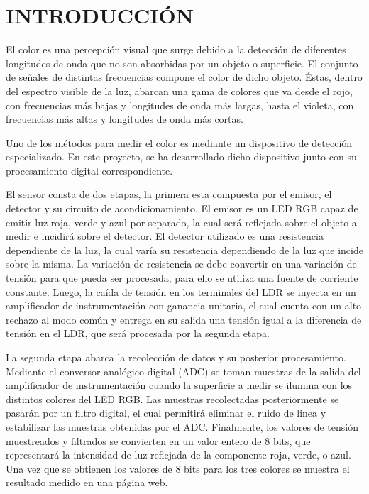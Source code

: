 \documentclass[12pt,a4paper,twoside,fleqn]{article}
\begin{document}
\section*{INTRODUCCIÓN}
El color es una percepción visual que surge debido a la detección de diferentes longitudes de onda que no son absorbidas por un objeto o superficie. El conjunto de señales de distintas frecuencias compone el color de dicho objeto. Éstas, dentro del espectro visible de la luz, abarcan una gama de colores que va desde el rojo, con frecuencias más bajas y longitudes de onda más largas, hasta el violeta, con frecuencias más altas y longitudes de onda más cortas.\cite{ARPN_RGB_COLOR_SENSING}

Uno de los métodos para medir el color es mediante un dispositivo de detección especializado. En este proyecto, se ha desarrollado dicho dispositivo junto con su procesamiento digital correspondiente.

El sensor consta de dos etapas, la primera esta compuesta por el emisor, el detector y su circuito de acondicionamiento. El emisor es un LED RGB capaz de emitir luz roja, verde y azul por separado, la cual será reflejada sobre el objeto a medir e incidirá sobre el detector. El detector utilizado es una resistencia dependiente de la luz, la cual varía su resistencia dependiendo de la luz que incide sobre la misma. La variación de resistencia se debe convertir en una variación de tensión para que pueda ser procesada, para ello se utiliza una fuente de corriente constante. Luego, la caída de tensión en los terminales del LDR se inyecta en un amplificador de instrumentación con ganancia unitaria, el cual cuenta con un alto rechazo al modo común y entrega en su salida una tensión igual a la diferencia de tensión en el LDR, que será procesada por la segunda etapa.

La segunda etapa abarca la recolección de datos y su posterior procesamiento. Mediante el conversor analógico-digital (ADC) se toman muestras de la salida del amplificador de instrumentación cuando la superficie a medir se ilumina con los distintos colores del LED RGB. Las muestras recolectadas posteriormente se pasarán por un filtro digital, el cual permitirá eliminar el ruido de linea y estabilizar las muestras obtenidas por el ADC. Finalmente, los valores de tensión muestreados y filtrados se convierten en un valor entero de 8 bits, que representará la intensidad de luz reflejada de la componente roja, verde, o azul. Una vez que se obtienen los valores de 8 bits para los tres colores se muestra el resultado medido en una página web.
\end{document}
